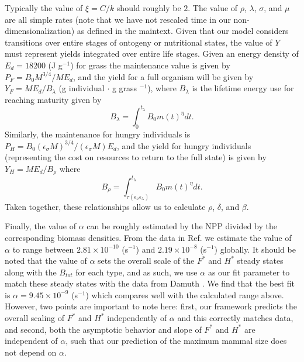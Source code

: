 \documentclass[twocolumn,preprintnumbers,amsmath,amssymb,superscriptaddress]{revtex4}
\begin{document}
Typically the value of $\xi=C/k$ should roughly be $2$. The value of $\rho$, $\lambda$, $\sigma$, and $\mu$ are all simple rates (note that we have not rescaled time in our non-dimensionalization) as defined in the maintext. Given that our model considers transitions over entire stages of ontogeny or nutritional states, the value of $Y$ must represent yields integrated over entire life stages. Given an energy density of $E_{d}=18200$ (J g$^{-1}$) for grass \citep{estermann} the maintenance value is given by $P_{F}=B_{0}M^{3/4}/ME_{d}$, and the yield for a full organism will be given by $Y_{F}=ME_{d}/B_{\lambda}$ (g individual $\cdot$ g grass $^{-1}$), where $B_{\lambda}$ is the lifetime energy use for reaching maturity given by
\begin{equation}
B_{\lambda}=\int_{0}^{t_{\lambda}}B_{0}m\left(t\right)^{\eta}dt.
\end{equation}
Similarly, the maintenance for hungry individuals is $P_{H}=B_{0}(\epsilon_{\sigma}M)^{3/4}/(\epsilon_{\sigma}M)E_{d}$, and the yield for hungry individuals (representing the cost on resources to return to the full state) is given by $Y_{H}=ME_{d}/B_{\rho}$ where
\begin{equation}
B_{\rho}=\int_{\tau\left(\epsilon_{\sigma}\epsilon_{\lambda}\right)}^{t_{\lambda}}B_{0}m\left(t\right)^{\eta}dt.
\end{equation}
Taken together, these relationships allow us to calculate $\rho$, $\delta$, and $\beta$.

Finally, the value of $\alpha$ can be roughly estimated by the NPP divided by the corresponding biomass densities. From the data in Ref. \citep{michaletz2014convergence} we estimate the value of $\alpha$ to range between $2.81\times10^{-10}$ (s$^{-1}$) and $2.19\times10^{-8}$ (s$^{-1}$) globally. It should be noted that the value of $\alpha$ sets the overall scale of the $F^{*}$ and $H^{*}$ steady states along with the $B_{tot}$ for each type, and as such, we use $\alpha$ as our fit parameter to match these steady states with the data from Damuth \citep{damuth1987interspecific}. We find that the best fit is $\alpha=9.45\times10^{-9}$ (s$^{-1}$) which compares well with the calculated range above. However, two points are important to note here: first, our framework predicts the overall scaling of $F^{*}$ and $H^{*}$ independently of $\alpha$ and this correctly matches data, and second, both the asymptotic behavior and slope of $F^{*}$ and $H^{*}$ are independent of $\alpha$, such that our prediction of the maximum mammal size does not depend on $\alpha$.
\\
\end{document}
